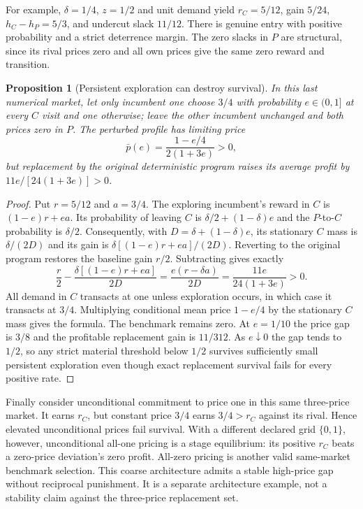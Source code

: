 \documentclass[11pt,a4paper]{article}
\newtheorem{proposition}[theorem]{Proposition}
\begin{document}
For example, $\delta=1/4$, $z=1/2$ and unit demand yield
$r_C=5/12$, gain $5/24$, $h_C-h_P=5/3$, and undercut slack $11/12$.
There is genuine entry with positive probability and a strict deterrence margin.
The zero slacks in $P$ are structural, since its rival prices zero and all
own prices give the same zero reward and transition.

\begin{proposition}[Persistent exploration can destroy survival]\label{prop:explore}
In this last numerical market, let only incumbent one choose $3/4$ with
probability $e\in(0,1]$ at every $C$ visit and one otherwise; leave the other
incumbent unchanged and both prices zero in $P$. The perturbed profile has
limiting price
\[
 \bar p(e)=\frac{1-e/4}{2(1+3e)}>0,
\]
but replacement by the original deterministic program raises its average
profit by $11e/[24(1+3e)]>0$.
\end{proposition}
\begin{proof}
Put $r=5/12$ and $a=3/4$. The exploring incumbent's reward in $C$ is
$(1-e)r+ea$. Its probability of leaving $C$ is
$\delta/2+(1-\delta)e$ and the $P$-to-$C$ probability is $\delta/2$.
Consequently, with $D=\delta+(1-\delta)e$, its stationary $C$ mass is
$\delta/(2D)$ and its gain is $\delta[(1-e)r+ea]/(2D)$.
Reverting to the original program restores the baseline gain $r/2$.
Subtracting gives exactly
\[
 \frac r2-\frac{\delta[(1-e)r+ea]}{2D}
 =\frac{e(r-\delta a)}{2D}
 =\frac{11e}{24(1+3e)}>0.
\]
All demand in $C$ transacts at one unless exploration occurs, in which case
it transacts at $3/4$. Multiplying conditional mean price $1-e/4$ by the
stationary $C$ mass gives the formula. The benchmark remains zero.
At $e=1/10$ the price gap is $3/8$ and the profitable replacement gain is
$11/312$. As $e\downarrow0$ the gap tends to $1/2$, so any strict material
threshold below $1/2$ survives sufficiently small persistent exploration
even though exact replacement survival fails for every positive rate.
\end{proof}

Finally consider unconditional commitment to price one in this same three-price
market. It earns $r_C$, but constant price $3/4$ earns $3/4>r_C$ against its
rival. Hence elevated unconditional prices fail survival. With a different
declared grid $\{0,1\}$, however, unconditional all-one pricing is a stage
equilibrium: its positive $r_C$ beats a zero-price deviation's zero profit.
All-zero pricing is another valid same-market benchmark selection. This coarse
architecture admits a stable high-price gap without reciprocal punishment.
It is a separate architecture example, not a stability claim against the
three-price replacement set.
\end{document}
